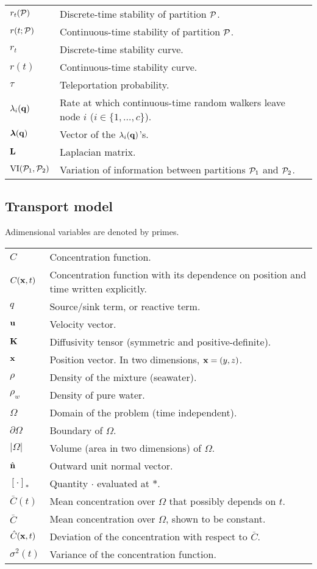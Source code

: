 \begin{table}[H]
\begin{tabular}{ll}
	$r_t(\P)$ & Discrete-time stability of partition $\P$.\\
	$r(t;\P)$ & Continuous-time stability of partition $\P$.\\
	$r_t$ & Discrete-time stability curve.\\
	$r(t)$ & Continuous-time stability curve.\\
	$\tau$ & Teleportation probability.\\
	$\lambda_i(\b q)$ & Rate at which continuous-time random walkers leave node $i$ ($i \in \{1,\dots,c\}$).\\
	$\bs \lambda(\b q)$ & Vector of the $\lambda_i(\b q)$'s.\\
	$\b L$ & Laplacian matrix.\\
	$\VI(\P_1,\P_2)$ & Variation of information between partitions $\P_1$ and $\P_2$.
\end{tabular}
\end{table}

\subsection*{Transport model}
Adimensional variables are denoted by primes.
\begin{table}[H]
\begin{tabular}{ll}
	$C$ & Concentration function.\\
	$C(\b x,t)$ & Concentration function with its dependence on position and time written explicitly.\\
	$q$ & Source/sink term, or reactive term.\\
	$\b u$ & Velocity vector.\\
	$\b K$ & Diffusivity tensor (symmetric and positive-definite).\\
	$\b x$ & Position vector. In two dimensions, $\b x = (y,z)$.\\
	$\rho$ & Density of the mixture (seawater).\\
	$\rho_w$ & Density of pure water.\\
	$\Omega$ & Domain of the problem (time independent).\\
	$\partial \Omega$ & Boundary of $\Omega$.\\
	$|\Omega|$ & Volume (area in two dimensions) of $\Omega$.\\
	$\n$ & Outward unit normal vector.\\
	$[\cdot]_{*}$ & Quantity $\cdot$ evaluated at $*$.\\
	$\bar{C}(t)$ & Mean concentration over $\Omega$ that possibly depends on $t$.\\
	$\bar{C}$ & Mean concentration over $\Omega$, shown to be constant.\\
	$\hat{C}(\b x,t)$ & Deviation of the concentration with respect to $\bar{C}$.\\
	$\sigma^2(t)$ & Variance of the concentration function.\\
\end{tabular}
\end{table}

